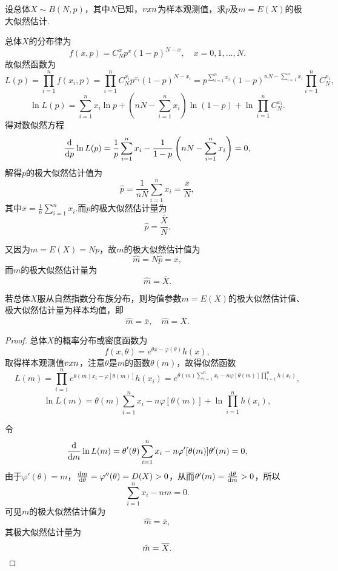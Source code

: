 \begin{example}
设总体\(X \sim B(N,p)\)，其中\(N\)已知，\(v{x}{n}\)为样本观测值，求\(p\)及\(m=E(X)\)的极大似然估计.
\begin{solution}
总体\(X\)的分布律为\[
f(x,p)=C_N^x p^x (1-p)^{N-x}, \quad x=0,1,\dots,N.
\]故似然函数为\[
L(p) = \prod\limits_{i=1}^n{f(x_i,p)}
= \prod\limits_{i=1}^n{C_N^{x_i} p^{x_i} (1-p)^{N-{x_i}}}
= p^{\sum\limits_{i=1}^n{x_i}} (1-p)^{nN-\sum\limits_{i=1}^n{x_i}} \prod\limits_{i=1}^n{C_N^{x_i}},
\]\[
\ln L(p)
= \sum\limits_{i=1}^n{x_i \ln p}
+ \left(nN - \sum\limits_{i=1}^n{x_i}\right) \ln(1-p)
+ \ln \prod\limits_{i=1}^n{C_N^{x_i}}.
\]得对数似然方程\[
\dv{p} \ln L(p)
= \frac{1}{p} \sum\limits_{i=1}^n{x_i}
- \frac{1}{1-p} \left(nN - \sum\limits_{i=1}^n{x_i}\right)
= 0,
\]解得\(p\)的极大似然估计值为\[
\hat{p} = \frac{1}{nN} \sum\limits_{i=1}^n{x_i}
= \frac{\overline{x}}{N},
\]其中\(\overline{x}=\frac{1}{n}\sum\limits_{i=1}^n{x_i}\).而\(p\)的极大似然估计量为\[
\hat{p} = \frac{\overline{X}}{N}.
\]

又因为\(m=E(X)=Np\)，故\(m\)的极大似然估计值为\[
\hat{m} = N\hat{p} = \overline{x},
\]而\(m\)的极大似然估计量为\[
\hat{m} = \overline{X}.
\]
\end{solution}
\end{example}

\begin{theorem}
若总体\(X\)服从自然指数分布族分布，则均值参数\(m=E(X)\)的极大似然估计值、极大似然估计量为样本均值，即\[
\hat{m}=\overline{x},
\quad
\hat{m}=\overline{X}.
\]
\begin{proof}
总体\(X\)的概率分布或密度函数为\[
f(x,\theta)=e^{\theta x - \varphi(\theta)} h(x),
\]取得样本观测值\(v{x}{n}\)，注意\(\theta\)是\(m\)的函数\(\theta(m)\)，故得似然函数\[
L(m) = \prod\limits_{i=1}^n{e^{\theta(m) x_i -\varphi[\theta(m)]} h(x_i)}
= e^{\theta(m) \sum\limits_{i=1}^n{x_i - n \varphi[\theta(m)]} \prod\limits_{i=1}^n{h(x_i)}},
\]\[
\ln L(m) = \theta(m) \sum\limits_{i=1}^n{x_i - n \varphi[\theta(m)]} + \ln \prod\limits_{i=1}^n{h(x_i)},
\]

令\[
\dv{m} \ln L(m) = \theta'(\theta) \sum\limits_{i=1}^n{x_i} - n \varphi'[\theta(m)] \theta'(m) = 0,
\]由于\(\varphi'(\theta) = m\)，\(\dv{m}{\theta} = \varphi''(\theta) = D(X) > 0\)，从而\(\theta'(m) = \dv{\theta}{m} > 0\)，所以\[
\sum\limits_{i=1}^n{x_i} - nm = 0.
\]可见\(m\)的极大似然估计值为\[
\hat{m} = \overline{x},
\]其极大似然估计量为\[
\hat{m} = \overline{X}.
\qedhere
\]
\end{proof}
\end{theorem}

